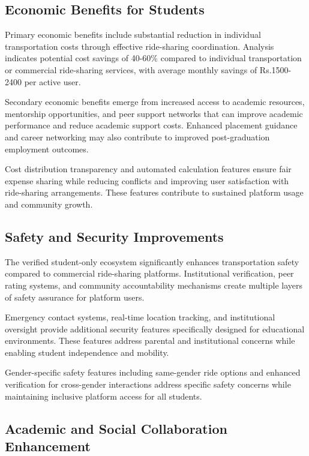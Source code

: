 \documentclass[conference]{IEEEtran}
\begin{document}
\subsection{Economic Benefits for Students}

Primary economic benefits include substantial reduction in individual transportation costs through effective ride-sharing coordination. Analysis indicates potential cost savings of 40-60\% compared to individual transportation or commercial ride-sharing services, with average monthly savings of Rs.1500-2400 per active user.

Secondary economic benefits emerge from increased access to academic resources, mentorship opportunities, and peer support networks that can improve academic performance and reduce academic support costs. Enhanced placement guidance and career networking may also contribute to improved post-graduation employment outcomes.

Cost distribution transparency and automated calculation features ensure fair expense sharing while reducing conflicts and improving user satisfaction with ride-sharing arrangements. These features contribute to sustained platform usage and community growth.

\subsection{Safety and Security Improvements}

The verified student-only ecosystem significantly enhances transportation safety compared to commercial ride-sharing platforms. Institutional verification, peer rating systems, and community accountability mechanisms create multiple layers of safety assurance for platform users.

Emergency contact systems, real-time location tracking, and institutional oversight provide additional security features specifically designed for educational environments. These features address parental and institutional concerns while enabling student independence and mobility.

Gender-specific safety features including same-gender ride options and enhanced verification for cross-gender interactions address specific safety concerns while maintaining inclusive platform access for all students.

\subsection{Academic and Social Collaboration Enhancement}
\end{document}
